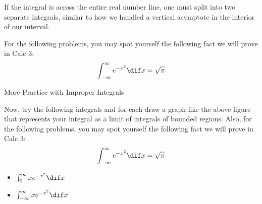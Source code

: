 If the integral is across the entire real number line, one must split into two separate integrals, similar to how we handled a vertical asymptote in the interior of our interval.  



For the following problems, you may spot yourself the following fact we will prove in Calc 3: $$ \int_{-\infty}^\infty e^{-x^2}\dif x = \sqrt{\pi}$$

\begin{exercise}{More Practice with Improper Integrals \Coffeecup \Coffeecup}

Now, try the following integrals and for each draw a graph like the above figure that represents your integral as a limit of integrals of bounded regions.  Also, for the following problems, you may spot yourself the following fact we will prove in Calc 3: $$ \int_{-\infty}^\infty e^{-x^2}\dif x = \sqrt{\pi}$$


\begin{itemize}
\item $ \int_{0}^\infty xe^{-x^2}\dif x $

\item $ \int_{-\infty}^\infty xe^{-x^2}\dif x $


\end{itemize}
\end{exercise}
